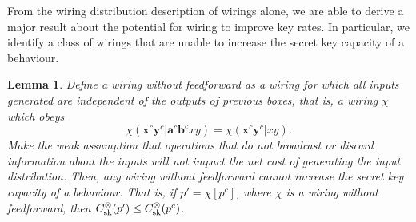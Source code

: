 \documentclass[10pt, a4paper]{article}
\numberwithin{equation}{section} %
\newcounter{stmt} %
\theoremstyle{definition}
\theoremstyle{plain}
\newtheorem{lemma}[stmt]{Lemma}
\newcommand{\?}{\mathrel{?}} %
\newcommand{\cvec}[1]{\boldsymbol{\mathbf{#1}}}    %
\newcommand{\sk}{\rm sk}
\begin{document}
                  From the wiring distribution description of wirings alone, we are able to derive a major result about the potential for wiring to improve key rates. In particular, we identify a class of wirings that are unable to increase the secret key capacity of a behaviour.
                  \begin{lemma}\label{thm:feedforward}
                    Define a \emph{wiring without feedforward} as a wiring for which all inputs generated are independent of the outputs of previous boxes, that is, a wiring \(\chi\) which obeys
                    \begin{equation}\label{eqn:nooutputdep}
                      \chi(\cvec{x}^c\cvec{y}^c|\cvec{a}^c\cvec{b}^cxy) = \chi(\cvec{x}^c\cvec{y}^c|xy).
                    \end{equation}
                    Make the weak assumption that operations that do not broadcast or discard information about the inputs will not impact the net cost of generating the input distribution. Then, any wiring without feedforward cannot increase the secret key capacity of a behaviour. That is, if \(p' = \chi[p^{c}]\), where \(\chi\) is a wiring without feedforward, then \(C_{\sk}^{\otimes}(p') \leq C_{\sk}^{\otimes}(p^c)\).
                  \end{lemma}
\end{document}
